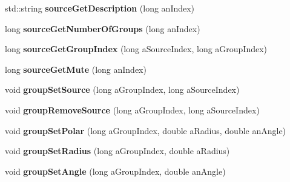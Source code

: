 \begin{DoxyCompactItemize}
\item 
\hypertarget{class_sources_manager_afd9aa7b2c5ebf7b83be6127b56187d45}{std\-::string {\bfseries source\-Get\-Description} (long an\-Index)}\label{class_sources_manager_afd9aa7b2c5ebf7b83be6127b56187d45}

\item 
\hypertarget{class_sources_manager_a411c768a08a4d2617828a438735d3e7e}{long {\bfseries source\-Get\-Number\-Of\-Groups} (long an\-Index)}\label{class_sources_manager_a411c768a08a4d2617828a438735d3e7e}

\item 
\hypertarget{class_sources_manager_a0e33521db6676f762cd4c5b3b98f21cb}{long {\bfseries source\-Get\-Group\-Index} (long a\-Source\-Index, long a\-Group\-Index)}\label{class_sources_manager_a0e33521db6676f762cd4c5b3b98f21cb}

\item 
\hypertarget{class_sources_manager_a31ebfd0c3b3bcd0ab3d48f0d78369a10}{long {\bfseries source\-Get\-Mute} (long an\-Index)}\label{class_sources_manager_a31ebfd0c3b3bcd0ab3d48f0d78369a10}

\item 
\hypertarget{class_sources_manager_a1e554c779274cd269562cc67d7f50f4b}{void {\bfseries group\-Set\-Source} (long a\-Group\-Index, long a\-Source\-Index)}\label{class_sources_manager_a1e554c779274cd269562cc67d7f50f4b}

\item 
\hypertarget{class_sources_manager_a700f0045bf0efc0e3c974b46b060c1a3}{void {\bfseries group\-Remove\-Source} (long a\-Group\-Index, long a\-Source\-Index)}\label{class_sources_manager_a700f0045bf0efc0e3c974b46b060c1a3}

\item 
\hypertarget{class_sources_manager_afc4fedafe19f3a7d2fa16852f6ab2a49}{void {\bfseries group\-Set\-Polar} (long a\-Group\-Index, double a\-Radius, double an\-Angle)}\label{class_sources_manager_afc4fedafe19f3a7d2fa16852f6ab2a49}

\item 
\hypertarget{class_sources_manager_aa702c540deb20ccb76bac8f1f51194a6}{void {\bfseries group\-Set\-Radius} (long a\-Group\-Index, double a\-Radius)}\label{class_sources_manager_aa702c540deb20ccb76bac8f1f51194a6}

\item 
\hypertarget{class_sources_manager_a01e3905fc26d77fbccea8616876b1665}{void {\bfseries group\-Set\-Angle} (long a\-Group\-Index, double an\-Angle)}\label{class_sources_manager_a01e3905fc26d77fbccea8616876b1665}


\end{DoxyCompactItemize}
